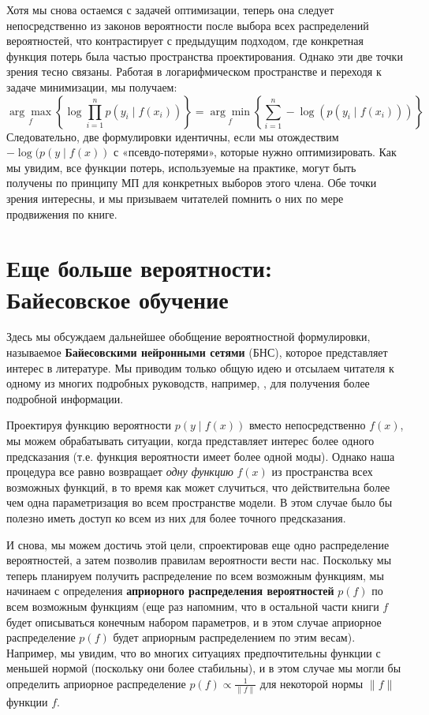 Хотя мы снова остаемся с задачей оптимизации, теперь она следует непосредственно из законов вероятности после выбора всех распределений вероятностей, что контрастирует с предыдущим подходом, где конкретная функция потерь была частью пространства проектирования. Однако эти две точки зрения тесно связаны. Работая в логарифмическом пространстве и переходя к задаче минимизации, мы получаем:
%
$$
\underset{f}{\arg\max} \left\{ \log \prod_{i=1}^n p(y_i \;\vert\; f(x_i)) \right\} = \underset{f}{\arg\min} \left\{ \sum_{i=1}^n -\log(p(y_i \;\vert\; f(x_i))) \right\}
$$
%
Следовательно, две формулировки идентичны, если мы отождествим $-\log(p(y \;\vert\; f(x))$ с «псевдо-потерями», которые нужно оптимизировать. Как мы увидим, все функции потерь, используемые на практике, могут быть получены по принципу МП для конкретных выборов этого члена. Обе точки зрения интересны, и мы призываем читателей помнить о них по мере продвижения по книге.

\section{Еще больше вероятности: Байесовское обучение}
\label{sec:bayesian_learning}

\addteacup Здесь мы обсуждаем дальнейшее обобщение вероятностной формулировки, называемое \textbf{Байесовскими нейронными сетями} (БНС), которое представляет интерес в литературе. Мы приводим только общую идею и отсылаем читателя к одному из многих подробных руководств, например, \cite{jospin2022hands}, для получения более подробной информации.

Проектируя функцию вероятности $p(y \;\vert\; f(x))$ вместо непосредственно $f(x)$, мы можем обрабатывать ситуации, когда представляет интерес более одного предсказания (т.е. функция вероятности имеет более одной моды). Однако наша процедура все равно возвращает \textit{одну функцию} $f(x)$ из пространства всех возможных функций, в то время как может случиться, что действительна более чем одна параметризация во всем пространстве модели. В этом случае было бы полезно иметь доступ ко всем из них для более точного предсказания.

И снова, мы можем достичь этой цели, спроектировав еще одно распределение вероятностей, а затем позволив правилам вероятности вести нас. Поскольку мы теперь планируем получить распределение по всем возможным функциям, мы начинаем с определения \textbf{априорного распределения вероятностей} $p(f)$ по всем возможным функциям (еще раз напомним, что в остальной части книги $f$ будет описываться конечным набором параметров, и в этом случае априорное распределение $p(f)$ будет априорным распределением по этим весам). Например, мы увидим, что во многих ситуациях предпочтительны функции с меньшей нормой (поскольку они более стабильны), и в этом случае мы могли бы определить априорное распределение $p(f) \propto \frac{1}{\lVert f \rVert}$ для некоторой нормы $\lVert f \rVert$ функции $f$. 

